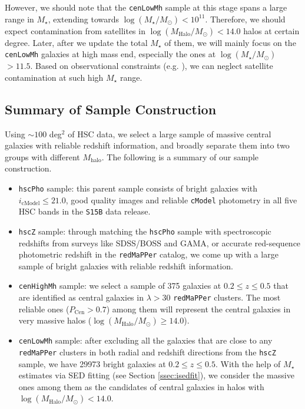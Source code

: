 \documentclass{emulateapj}
\def\redm{\texttt{redMaPPer}}
\def\rbcg{\texttt{cenHighMh}}
\def\nbcg{\texttt{cenLowMh}}
\def\mstar{{$M_{\star}$}}
\def\mhalo{{$M_{\mathrm{halo}}$}}
\def\logms{{$\log (M_{\star}/M_{\odot})$}}
\def\logmh{{$\log (M_{\mathrm{Halo}}/M_{\odot})$}}
\begin{document}
\begin{CJK*}{UTF8}{gbsn}
    However, we should note that the \nbcg{} sample at this stage spans a large range
    in \mstar{}, extending towards \logms{}$<10^{11}$.  
    Therefore, we should expect contamination from satellites in \logmh{}$< 14.0$ halos
    at certain degree.  
    Later, after we update the total \mstar{} of them, we will mainly focus on the 
    \nbcg{} galaxies at high mass end, especially the ones at \logms{}$ > 11.5$. 
    Based on observational constraints (e.g. \citealt{vanUitert2016}), we can neglect 
    satellite contamination at such high \mstar{} range. 

\subsection{Summary of Sample Construction}
    \label{ssec:sample}

    Using $\sim 100$ deg$^2$ of HSC data, we select a large sample
    of massive central galaxies with reliable redshift information, and broadly separate 
    them into two groups with different \mhalo{}. The following is a summary of our sample construction.
    
    \begin{itemize}
        \item \texttt{hscPho} sample: this parent sample consists of bright galaxies 
            with $i_{\mathrm{cModel}} \leq 21.0$, good quality images and reliable 
            \texttt{cModel} photometry in all five HSC bands in the \texttt{S15B} 
            data release. 
        \item \texttt{hscZ} sample: through matching the \texttt{hscPho} sample with 
            spectroscopic redshifts from surveys like SDSS/BOSS and GAMA, or accurate 
            red-sequence photometric redshift in the \redm{} catalog, we come up with 
            a large sample of bright galaxies with reliable redshift information. 
        \item \rbcg{} sample: we select a sample of 375 galaxies at $0.2 \leq z \leq 0.5$
            that are identified as central galaxies in $\lambda > 30$ \redm{} clusters. 
            The most reliable ones ($P_{\mathrm{Cen}} >0.7$) among 
            them will represent the central galaxies in very massive halos
            (\logmh{}$\geq 14.0$). 
        \item \nbcg{} sample: after excluding all the galaxies that are close to any 
            \redm{} clusters in both radial and redshift directions from the 
            \texttt{hscZ} sample, we have 29973 bright galaxies at $0.2 \leq z \leq 0.5$.
            With the help of \mstar{} estimates via SED fitting (see Section 
            \ref{ssec:isedfit}), we consider the massive ones among them as the 
            candidates of central galaxies in halos with \logmh{}$<14.0$.  
    \end{itemize}
    

\end{CJK*}
\end{document}
